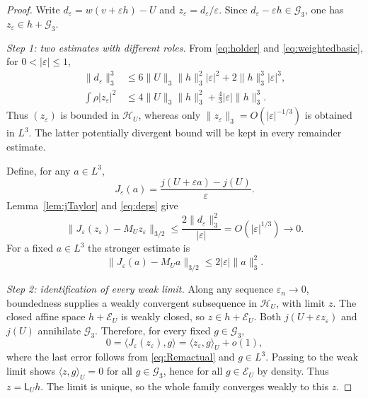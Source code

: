 \documentclass[11pt,a4paper]{article}
\theoremstyle{definition}\newtheorem{definition}[theorem]{Definition}
\theoremstyle{remark}\newtheorem{remark}[theorem]{Remark}
\newcommand{\G}{\mathcal G_3}
\newcommand{\HH}{\mathcal H}
\newcommand{\GG}{\mathcal E}
\newcommand{\LP}{\mathsf L}
\newcommand{\norm}[1]{\lVert #1\rVert}
\newcommand{\ip}[2]{\langle #1,#2\rangle}
\numberwithin{equation}{section}
\begin{document}
\begin{proof}
Write $d_\varepsilon=w(v+\varepsilon h)-U$ and
$z_\varepsilon=d_\varepsilon/\varepsilon$. Since
$d_\varepsilon-\varepsilon h\in\G$, one has
$z_\varepsilon\in h+\G$.

\emph{Step 1: two estimates with different roles.}
From \eqref{eq:holder} and \eqref{eq:weightedbasic}, for $0<|\varepsilon|\le1$,
\begin{align}
 \norm{d_\varepsilon}_3^3
 &\le6\norm U_3\norm h_3^2|\varepsilon|^2
       +2\norm h_3^3|\varepsilon|^3,\label{eq:deps}\\
 \int\rho|z_\varepsilon|^2
 &\le4\norm U_3\norm h_3^2+\tfrac43|\varepsilon|\norm h_3^3.\label{eq:zweighted}
\end{align}
Thus $(z_\varepsilon)$ is bounded in $\HH_U$, whereas only
$\norm{z_\varepsilon}_3=O(|\varepsilon|^{-1/3})$ is obtained in $L^3$.
The latter potentially divergent bound will be kept in every remainder estimate.

Define, for any $a\in L^3$,
\[
 J_\varepsilon(a)=\frac{j(U+\varepsilon a)-j(U)}{\varepsilon}.
\]
Lemma~\ref{lem:jTaylor} and \eqref{eq:deps} give
\begin{equation}\label{eq:Remactual}
 \norm{J_\varepsilon(z_\varepsilon)-M_Uz_\varepsilon}_{3/2}
 \le\frac{2\norm{d_\varepsilon}_3^2}{|\varepsilon|}
 =O(|\varepsilon|^{1/3})\longrightarrow0.
\end{equation}
For a fixed $a\in L^3$ the stronger estimate is
\begin{equation}\label{eq:Remfixed}
 \norm{J_\varepsilon(a)-M_Ua}_{3/2}
 \le2|\varepsilon|\norm a_3^2.
\end{equation}

\emph{Step 2: identification of every weak limit.}
Along any sequence $\varepsilon_n\to0$, boundedness supplies a weakly convergent subsequence in $\HH_U$, with limit $z$. The closed affine space $h+\GG_U$ is weakly closed, so $z\in h+\GG_U$. Both $j(U+\varepsilon z_\varepsilon)$ and $j(U)$ annihilate $\G$. Therefore, for every fixed $g\in\G$,
\[
 0=\ip{J_\varepsilon(z_\varepsilon)}g
   =\ip{z_\varepsilon}g_U+o(1),
\]
where the last error follows from \eqref{eq:Remactual} and $g\in L^3$. Passing to the weak limit shows $\ip zg_U=0$ for all $g\in\G$, hence for all $g\in\GG_U$ by density. Thus $z=\LP_Uh$. The limit is unique, so the whole family converges weakly to this $z$.


\end{proof}
\end{document}
